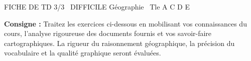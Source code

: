 \documentclass[11pt]{article}
\begin{document}
\begin{tcolorbox}[enhanced,colback=popink,colframe=popink,arc=10pt,boxrule=0pt,left=12pt,right=12pt,top=9pt,bottom=9pt]
{\color{white}\popxbold\small FICHE DE TD 3/3 \textbullet\ DIFFICILE \hfill Géographie \textbullet\ Tle A C D E\par}
\end{tcolorbox}
\vspace{4pt}
\noindent \textbf{Consigne :} Traitez les exercices ci-dessous en mobilisant vos connaissances du cours, l'analyse rigoureuse des documents fournis et vos savoir-faire cartographiques. La rigueur du raisonnement géographique, la précision du vocabulaire et la qualité graphique seront évaluées.
\end{document}
